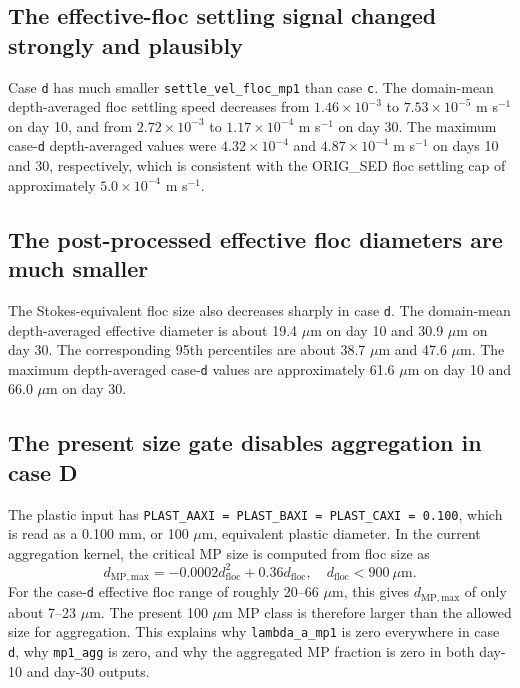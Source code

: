 \documentclass[11pt]{article}
\begin{document}
\subsection*{The effective-floc settling signal changed strongly and plausibly}

Case \texttt{d} has much smaller \texttt{settle\_vel\_floc\_mp1} than case
\texttt{c}.  The domain-mean depth-averaged floc settling speed decreases from
$1.46\times10^{-3}$ to $7.53\times10^{-5}$ m s$^{-1}$ on day 10, and from
$2.72\times10^{-3}$ to $1.17\times10^{-4}$ m s$^{-1}$ on day 30.  The maximum
case-\texttt{d} depth-averaged values were $4.32\times10^{-4}$ and
$4.87\times10^{-4}$ m s$^{-1}$ on days 10 and 30, respectively, which is
consistent with the ORIG\_SED floc settling cap of approximately
$5.0\times10^{-4}$ m s$^{-1}$.

\subsection*{The post-processed effective floc diameters are much smaller}

The Stokes-equivalent floc size also decreases sharply in case \texttt{d}.  The
domain-mean depth-averaged effective diameter is about 19.4 $\mu$m on day 10
and 30.9 $\mu$m on day 30.  The corresponding 95th percentiles are about
38.7 $\mu$m and 47.6 $\mu$m.  The maximum depth-averaged case-\texttt{d}
values are approximately 61.6 $\mu$m on day 10 and 66.0 $\mu$m on day 30.

\subsection*{The present size gate disables aggregation in case D}

The plastic input has \texttt{PLAST\_AAXI = PLAST\_BAXI = PLAST\_CAXI = 0.100},
which is read as a 0.100 mm, or 100 $\mu$m, equivalent plastic diameter.  In the
current aggregation kernel, the critical MP size is computed from floc size as
\begin{equation}
  d_{\mathrm{MP,max}} =
  -0.0002 d_{\mathrm{floc}}^2 + 0.36 d_{\mathrm{floc}},
  \quad d_{\mathrm{floc}} < 900\ \mu\mathrm{m}.
\end{equation}
For the case-\texttt{d} effective floc range of roughly 20--66 $\mu$m, this
gives $d_{\mathrm{MP,max}}$ of only about 7--23 $\mu$m.  The present 100 $\mu$m
MP class is therefore larger than the allowed size for aggregation.  This
explains why \texttt{lambda\_a\_mp1} is zero everywhere in case \texttt{d}, why
\texttt{mp1\_agg} is zero, and why the aggregated MP fraction is zero in both
day-10 and day-30 outputs.
\end{document}
